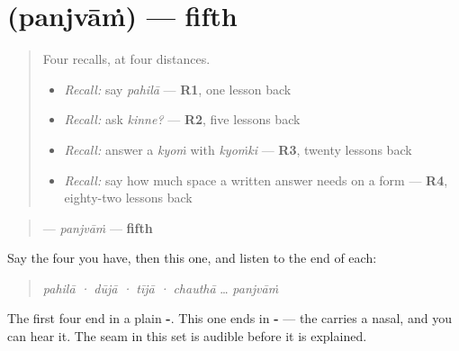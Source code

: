 \section[\texorpdfstring{\pa{ਪੰਜਵਾਂ} (panjvāṁ)}{ਪੰਜਵਾਂ (panjvāṁ)}]{ (panjvāṁ) — fifth}

\label{lesson:PA-C44-panjvan}



\begin{quote}
Four recalls, at four distances.

\begin{itemize}
\raggedright
  \item \emph{Recall:} say \emph{pahilā} — \textbf{R1}, one lesson back
  \item \emph{Recall:} ask \emph{kinne?} — \textbf{R2}, five lessons back
  \item \emph{Recall:} answer a \emph{kyoṁ} with \emph{kyoṁki} — \textbf{R3}, twenty lessons back
  \item \emph{Recall:} say how much space a written answer needs on a form — \textbf{R4}, eighty-two lessons back
\end{itemize}
\end{quote}

\begin{cousinweb}
\begin{quote}
\textbf{} — \emph{panjvāṁ} — \textbf{fifth}
\end{quote}

Say the four you have, then this one, and listen to the end of each:

\begin{quote}
\emph{pahilā · dūjā · tījā · chauthā} … \emph{panjvāṁ}
\end{quote}

The first four end in a plain \textbf{-}. This one ends in \textbf{-} — the \textbf{} carries a nasal, and you can hear it. The seam in this set is audible before it is explained.
\end{cousinweb}

